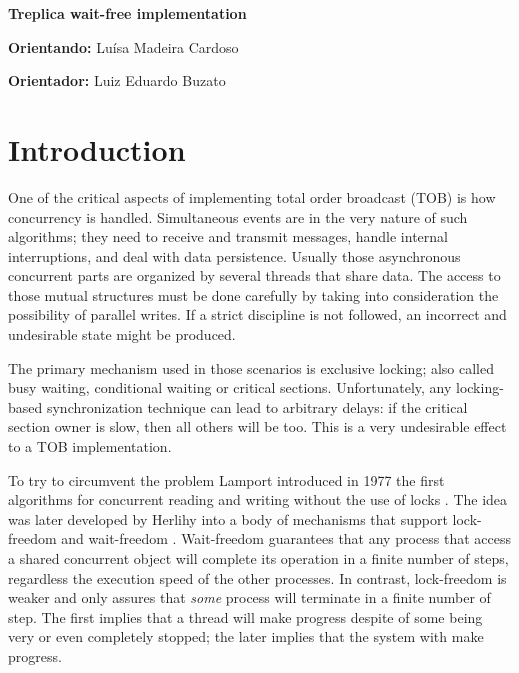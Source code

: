\documentclass[12pt,twoside,a4paper]{article}
\begin{document}
\vskip 15mm

\begin{center} 
\textbf{Treplica wait-free implementation}
\end{center}

\vskip 5mm

\textbf{Orientando:} Luísa Madeira Cardoso

\textbf{Orientador:} Luiz Eduardo Buzato 

\vskip 20mm

\begin{abstract}

\end{abstract}

\newpage
\pagestyle{plain}
\headheight 0.0cm
\headsep 0.0cm
\footskip 2.2cm

\section{Introduction}
One of the critical aspects of implementing total order broadcast (TOB) is how concurrency is handled. Simultaneous events are in the very nature of such algorithms; they need to receive and transmit messages, handle internal interruptions, and deal with data persistence. Usually those asynchronous concurrent parts are organized by several threads that share data. The access to those mutual structures must be done carefully by taking into consideration the possibility of parallel writes. If a strict discipline is not followed, an incorrect and undesirable state might be produced. 

The primary mechanism used in those scenarios is exclusive locking; also called busy waiting, conditional waiting or critical sections. Unfortunately, any locking-based synchronization technique can lead  to arbitrary delays: if the critical section owner is slow, then all others will be too. This is a very undesirable effect to a TOB implementation. 

To try to circumvent the problem Lamport introduced in 1977 the first algorithms for concurrent reading and writing without the use of locks \cite{lamport77b}. The idea was later developed by Herlihy into a body of mechanisms that support lock-freedom and wait-freedom \cite{herlihy1990methodology}. Wait-freedom guarantees that any process that access a shared concurrent  object will complete its operation in a finite number of steps, regardless  the execution speed of the other processes. In contrast, lock-freedom is weaker and only assures that \textit{some} process will terminate in a finite number of step. The first implies that a thread will make progress despite of some being very or even completely stopped; the later implies that the system with make progress. 
\end{document}
